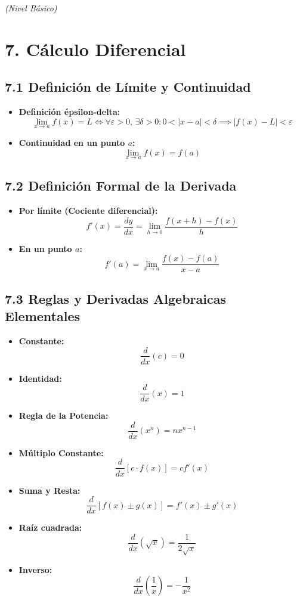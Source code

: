\documentclass[11pt,a4paper]{article}
\begin{document}
\textit{(Nivel Básico)}

\section*{7. Cálculo Diferencial}

\subsection*{7.1 Definición de Límite y Continuidad}

\begin{itemize}
  \item \textbf{Definición épsilon-delta:}
  \[
    \lim_{x \to a} f(x) = L \iff \forall \varepsilon > 0, \, \exists \delta > 0 : 0 < |x - a| < \delta \implies |f(x) - L| < \varepsilon
  \]
  \item \textbf{Continuidad en un punto $a$:}
  \[
    \lim_{x \to a} f(x) = f(a)
  \]
\end{itemize}

\subsection*{7.2 Definición Formal de la Derivada}

\begin{itemize}
  \item \textbf{Por límite (Cociente diferencial):}
  \[
    f'(x) = \frac{dy}{dx} = \lim_{h \to 0} \frac{f(x + h) - f(x)}{h}
  \]
  \item \textbf{En un punto $a$:}
  \[
    f'(a) = \lim_{x \to a} \frac{f(x) - f(a)}{x - a}
  \]
\end{itemize}

\subsection*{7.3 Reglas y Derivadas Algebraicas Elementales}

\begin{itemize}
  \item \textbf{Constante:}
  \[
    \frac{d}{dx}(c) = 0
  \]
  \item \textbf{Identidad:}
  \[
    \frac{d}{dx}(x) = 1
  \]
  \item \textbf{Regla de la Potencia:}
  \[
    \frac{d}{dx}(x^n) = n x^{n - 1}
  \]
  \item \textbf{Múltiplo Constante:}
  \[
    \frac{d}{dx}[c \cdot f(x)] = c f'(x)
  \]
  \item \textbf{Suma y Resta:}
  \[
    \frac{d}{dx}[f(x) \pm g(x)] = f'(x) \pm g'(x)
  \]
  \item \textbf{Raíz cuadrada:}
  \[
    \frac{d}{dx}(\sqrt{x}) = \frac{1}{2\sqrt{x}}
  \]
  \item \textbf{Inverso:}
  \[
    \frac{d}{dx}\left(\frac{1}{x}\right) = -\frac{1}{x^2}
  \]
\end{itemize}
\end{document}
